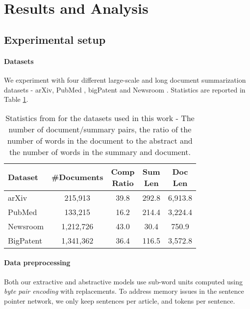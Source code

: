 \documentclass[letterpaper]{article} \usepackage{arXiv_V2_aaai_sty_mods}  \usepackage{times}  \usepackage{helvet} \usepackage{courier}  \usepackage[hyphens]{url}  \usepackage{graphicx} \usepackage[utf8]{inputenc} \usepackage[T1]{fontenc}    \usepackage{url}            \usepackage{booktabs}       \usepackage{amsfonts}       \usepackage{nicefrac}       \usepackage{multirow}
\begin{document}
\section{Results and Analysis}
\subsection{Experimental setup}
\label{sec:experimental_setup}
\paragraph{Datasets}
We experiment with four different large-scale and long document summarization datasets - arXiv, PubMed \cite{discourse/corr/abs-1804-05685}, bigPatent \cite{sharma2019bigpatent} and Newsroom \cite{grusky2018newsroom}. Statistics are reported in Table \ref{tab:dataset}.

\begin{table}[ht]
\centering
\caption{Statistics from \cite{sharma2019bigpatent} for the datasets used in this work - The number of document/summary pairs, the ratio of the number of words in the document to the abstract and the number of words in the summary and document.}
\label{tab:dataset}
\small
\begin{tabular}{|l|c|c|c|c|}
	\hline 
		Dataset & \#Documents & \shortstack{Comp \\ Ratio} & \shortstack{Sum \\ Len} & \shortstack{Doc \\ Len}  \\
		\hline
        arXiv & 215,913 & 39.8 & 292.8 & 6,913.8 \\ 
        PubMed & 133,215 & 16.2 & 214.4 & 3,224.4 \\
        Newsroom & 1,212,726 & 43.0 & 30.4 & 750.9 \\
        BigPatent & 1,341,362 & 36.4 & 116.5 & 3,572.8 \\
    \hline
\end{tabular}
\end{table}

\paragraph{Data preprocessing} Both our extractive and abstractive models use sub-word units computed using \emph{byte pair encoding} \cite{sennrich2015neural} with  replacements. To address memory issues in the sentence pointer network, we only keep  sentences per article, and  tokens per sentence.
\end{document}
